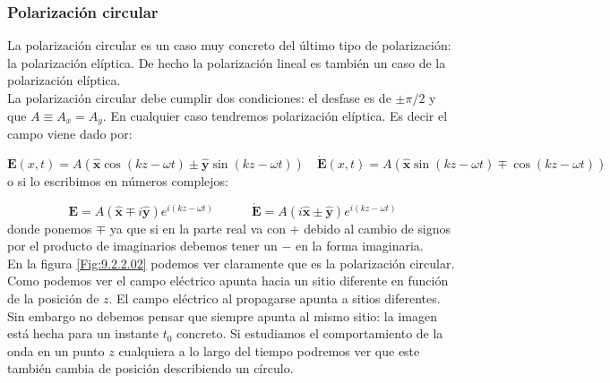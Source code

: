 \documentclass[12pt]{article}
\newcommand{\tquad}{\quad \quad \quad}
\newcommand{\En}{\mathbf{E}}
\newcommand{\hnx}{\hat{\mathbf{x}}}
\newcommand{\hny}{\hat{\mathbf{y}}}
\numberwithin{equation}{section}
\numberwithin{figure}{section}
\begin{document}
\subsubsection{Polarización circular}

La polarización circular es un caso muy concreto del último tipo de polarización: la polarización elíptica. De hecho la polarización lineal es también un caso de la polarización elíptica.  \\

La polarización circular debe cumplir dos condiciones: el desfase es de $\pm \pi/2$ y que $A\equiv A_x=A_y$. En cualquier caso tendremos polarización elíptica. Es decir el campo viene dado por:

\begin{equation}
\En(x,t) = A (\hnx \cos(kz-\omega t) \pm \hny \sin (kz-\omega t))  \quad \dot{\En} (x,t) = A (\hnx \sin (kz-\omega t) \mp \cos (kz-\omega t)) \label{Ec:09.2.2.07}
\end{equation}
o si lo escribimos en números complejos:

\begin{equation}
\En = A(\hnx \mp i\hny) e^{i (kz-\omega t)} \tquad \dot{\En} = A ( i \hnx \pm \hny) e^{i (kz-\omega t)} \label{Ec:09.2.2.08}
\end{equation}
donde ponemos $\mp$ ya que si en la parte real va con $+$ debido al cambio de signos por el producto de imaginarios debemos tener un $-$ en la forma imaginaria. \\

En la figura \ref{Fig:9.2.2.02} podemos ver claramente que es la polarización circular. Como podemos ver el campo eléctrico apunta hacia un sitio diferente en función de la posición de $z$. El campo eléctrico al propagarse apunta a sitios diferentes. Sin embargo no debemos pensar que siempre apunta al mismo sitio: la imagen está hecha para un instante $t_0$ concreto. Si estudiamos el comportamiento de la onda en un punto $z$ cualquiera a lo largo del tiempo podremos ver que este también cambia de posición describiendo un círculo.
\end{document}
